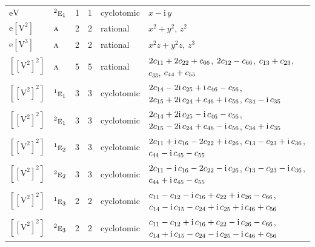 \documentclass[10pt,a4paper]{article}
\numberwithin{equation}{section}
\newcommand{\irr}[1]{\text{\normalfont\scshape #1}}
\newcommand{\conjpair}[1]{{}^{#1}}
\newcommand{\iunit}{\mathrm{i}}
\newcommand{\jahn}[1]{\mathrm{#1}}
\newlength{\fillwidth}\newlength{\cellwidth}\newlength{\colwidth}
\newcommand{\signbreak}{\penalty100\relax}
\begin{document}
{\begin{longtable}{@{}llrrl>{\RaggedRight\arraybackslash}p{\fillwidth}@{}}
$\jahn{eV}$ & $\conjpair{2}\irr{e}_{1}$ & 1 & 1 & cyclotomic & $x - \iunit{}\,y$\\
$\jahn{e[V^{2}]}$ & $\irr{a}$ & 2 & 2 & rational & $x^{2} + y^{2}$, $z^{2}$\\
$\jahn{e[V^{3}]}$ & $\irr{a}$ & 2 & 2 & rational & $x^{2}z + y^{2}z$, $z^{3}$\\
$\jahn{[[V^{2}]^{2}]}$ & $\irr{a}$ & 5 & 5 & rational & $2c_{11} +\signbreak 2c_{22} +\signbreak c_{66}$, $2c_{12} -\signbreak c_{66}$, $c_{13} +\signbreak c_{23}$, $c_{33}$, $c_{44} +\signbreak c_{55}$\\
$\jahn{[[V^{2}]^{2}]}$ & $\conjpair{1}\irr{e}_{1}$ & 3 & 3 & cyclotomic & $2c_{14} -\signbreak 2\iunit{}\,c_{25} +\signbreak \iunit{}\,c_{46} -\signbreak c_{56}$, $2c_{15} +\signbreak 2\iunit{}\,c_{24} +\signbreak c_{46} +\signbreak \iunit{}\,c_{56}$, $c_{34} -\signbreak \iunit{}\,c_{35}$\\
$\jahn{[[V^{2}]^{2}]}$ & $\conjpair{2}\irr{e}_{1}$ & 3 & 3 & cyclotomic & $2c_{14} +\signbreak 2\iunit{}\,c_{25} -\signbreak \iunit{}\,c_{46} -\signbreak c_{56}$, $2c_{15} -\signbreak 2\iunit{}\,c_{24} +\signbreak c_{46} -\signbreak \iunit{}\,c_{56}$, $c_{34} +\signbreak \iunit{}\,c_{35}$\\
$\jahn{[[V^{2}]^{2}]}$ & $\conjpair{1}\irr{e}_{2}$ & 3 & 3 & cyclotomic & $2c_{11} +\signbreak \iunit{}\,c_{16} -\signbreak 2c_{22} +\signbreak \iunit{}\,c_{26}$, $c_{13} -\signbreak c_{23} +\signbreak \iunit{}\,c_{36}$, $c_{44} -\signbreak \iunit{}\,c_{45} -\signbreak c_{55}$\\
$\jahn{[[V^{2}]^{2}]}$ & $\conjpair{2}\irr{e}_{2}$ & 3 & 3 & cyclotomic & $2c_{11} -\signbreak \iunit{}\,c_{16} -\signbreak 2c_{22} -\signbreak \iunit{}\,c_{26}$, $c_{13} -\signbreak c_{23} -\signbreak \iunit{}\,c_{36}$, $c_{44} +\signbreak \iunit{}\,c_{45} -\signbreak c_{55}$\\
$\jahn{[[V^{2}]^{2}]}$ & $\conjpair{1}\irr{e}_{3}$ & 2 & 2 & cyclotomic & $c_{11} -\signbreak c_{12} -\signbreak \iunit{}\,c_{16} +\signbreak c_{22} +\signbreak \iunit{}\,c_{26} -\signbreak c_{66}$, $c_{14} -\signbreak \iunit{}\,c_{15} -\signbreak c_{24} +\signbreak \iunit{}\,c_{25} +\signbreak \iunit{}\,c_{46} +\signbreak c_{56}$\\
$\jahn{[[V^{2}]^{2}]}$ & $\conjpair{2}\irr{e}_{3}$ & 2 & 2 & cyclotomic & $c_{11} -\signbreak c_{12} +\signbreak \iunit{}\,c_{16} +\signbreak c_{22} -\signbreak \iunit{}\,c_{26} -\signbreak c_{66}$, $c_{14} +\signbreak \iunit{}\,c_{15} -\signbreak c_{24} -\signbreak \iunit{}\,c_{25} -\signbreak \iunit{}\,c_{46} +\signbreak c_{56}$\\

\end{longtable}}
\end{document}
